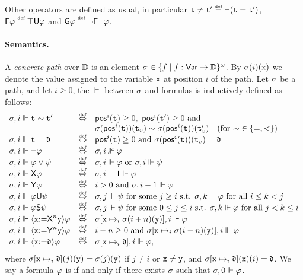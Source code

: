  Other operators are defined as usual, in particular $\aterm\neq \aterm'\egdef \neg(\aterm = \aterm')$, $\Eventually\aformula \egdef \top\Until\aformula$ and $\Always\aformula \egdef \neg\Eventually\neg\aformula$. 


\paragraph{Semantics.} A \emph{concrete path} over $\mathbb{D}$ is an element $\sigma\in\{f\mid f:{\rm \sf Var}\to\mathbb{D}\}^\omega$. By $\sigma(i)(\mathtt{x})$ we denote the value assigned to the variable $\mathtt{x}$ at position $i$ of the path.
Let $\sigma$ be a path, and let $i\geq 0$, the  $\models$ between $\sigma$ and formulas is inductively defined as follows:
\[
\begin{array}{lcl}
\apath,i \models \aterm \sim \aterm' & \iffdef & \pos^i(\aterm) \geq 0, \ \pos^i(\aterm') \geq 0 \mbox{ and } \\ & & \apath(\pos^i(\aterm))(\aterm_v) \sim \apath(\pos^i(\aterm))(\aterm'_v) \ \  \mbox{ (for ${\sim}\in\{=,<\}$) } \\
\apath,i \models \aterm = \adatum & \iffdef & \pos^i(\aterm) \geq 0 \mbox{ and } \apath(\pos^i(\aterm))(\aterm_v) = \adatum \\
\apath,i \models \neg\aformula & \iffdef & \apath,i \nVdash\aformula \\
\apath,i \models \aformula\vee\aformulabis & \iffdef & \apath,i \models \aformula \mbox{ or } \apath,i \models \aformulabis \\
\apath,i \models \Next\aformula & \iffdef & \apath,i+1 \models \aformula \\ 
\apath,i \models \Prev\aformula & \iffdef & i>0 \mbox{ and } \apath,i-1 \models \aformula \\
\apath,i \models \aformula\Until\aformulabis & \iffdef & \apath,j \models \aformulabis \mbox{ for some } j\geq i \mbox{ s.t. } \apath,k \models \aformula \mbox{ for all } i\leq k < j \\
\apath,i \models \aformula\Since\aformulabis & \iffdef & \apath,j \models \aformulabis \mbox{ for some } 0\leq j \leq i \mbox{ s.t. } \apath,k \models \aformula \mbox{ for all } j< k \leq i \\
\apath,i \models \Assign{\avar}{\Nextn\avarbis}\aformula & \iffdef & \apath[\avar\mapsto_i \apath(i+n)(\avarbis)],i \models \aformula \\ 
\apath,i \models \Assign{\avar}{\Prevn\avarbis}\aformula & \iffdef & i-n\geq 0 \mbox{ and } \apath[\avar\mapsto_i \apath(i-n)(\avarbis)],i \models \aformula \\
\apath,i \models \Assign{\avar}{\adatum}\aformula & \iffdef & \apath[\avar\mapsto_i \adatum],i \models \aformula, \\ 
\end{array}
\]
where $\sigma[\mathtt{x}\mapsto_i \mathfrak{d}](j)(\mathtt{y})=\sigma(j)(\mathtt{y})$ if $j\neq i$  or $\mathtt{x}\neq\mathtt{y}$, and $\sigma[\mathtt{x}\mapsto_i \mathfrak{d}](\mathtt{x})(i)  = \mathfrak{d}$. 
We say a formula $\varphi$ is  if and only if there exists $\sigma$ such that $\sigma,0\Vdash\varphi$.




